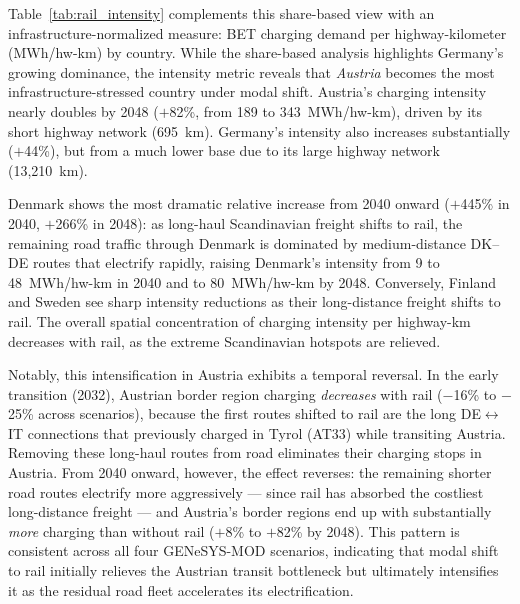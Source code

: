     Table~\ref{tab:rail_intensity} complements this share-based view with an infrastructure-normalized measure: \ac{BET} charging demand per highway-kilometer (MWh/hw-km) by country. While the share-based analysis highlights Germany's growing dominance, the intensity metric reveals that \emph{Austria} becomes the most infrastructure-stressed country under modal shift. Austria's charging intensity nearly doubles by 2048 ($+$82\%, from 189 to 343~MWh/hw-km), driven by its short highway network (695~km). Germany's intensity also increases substantially ($+$44\%), but from a much lower base due to its large highway network (13,210~km).

    Denmark shows the most dramatic relative increase from 2040 onward ($+$445\% in 2040, $+$266\% in 2048): as long-haul Scandinavian freight shifts to rail, the remaining road traffic through Denmark is dominated by medium-distance DK--DE routes that electrify rapidly, raising Denmark's intensity from 9 to 48~MWh/hw-km in 2040 and to 80~MWh/hw-km by 2048. Conversely, Finland and Sweden see sharp intensity reductions as their long-distance freight shifts to rail. The overall spatial concentration of charging intensity per highway-km decreases with rail, as the extreme Scandinavian hotspots are relieved.

    Notably, this intensification in Austria exhibits a temporal reversal. In the early transition (2032), Austrian border region charging \emph{decreases} with rail ($-$16\% to $-$25\% across scenarios), because the first routes shifted to rail are the long DE$\leftrightarrow$IT connections that previously charged in Tyrol (AT33) while transiting Austria. Removing these long-haul routes from road eliminates their charging stops in Austria. From 2040 onward, however, the effect reverses: the remaining shorter road routes electrify more aggressively --- since rail has absorbed the costliest long-distance freight --- and Austria's border regions end up with substantially \emph{more} charging than without rail ($+$8\% to $+$82\% by 2048). This pattern is consistent across all four GENeSYS-MOD scenarios, indicating that modal shift to rail initially relieves the Austrian transit bottleneck but ultimately intensifies it as the residual road fleet accelerates its electrification.


